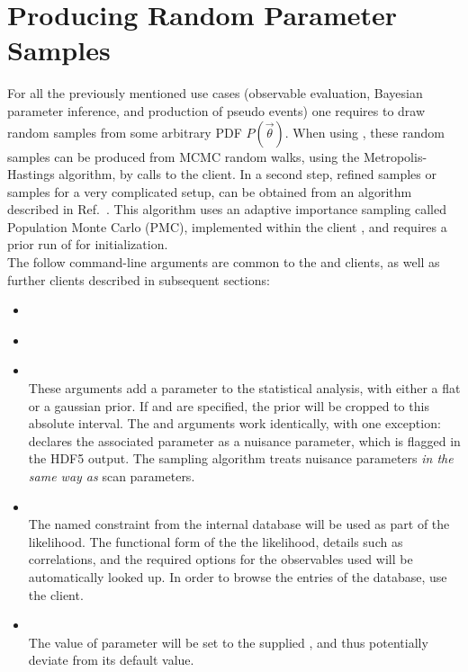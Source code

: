 \section{Producing Random Parameter Samples}
\label{sec:usage:eos-sample-mcmc+pmc}

For all the previously mentioned use cases (observable evaluation, Bayesian
parameter inference, and production of pseudo events) one requires to draw
random samples from some arbitrary \gls{PDF} $P(\vec\theta)$.  When using \EOS,
these random samples can be produced from \gls{MCMC} random walks, using the
Metropolis-Hastings algorithm, by calls to the  client.
In a second step, refined samples or samples for a very complicated setup, can
be obtained from an algorithm described in Ref.~\cite{Beaujean:2013}. This
algorithm uses an adaptive importance sampling called Population Monte Carlo
(PMC), implemented within the client , and requires a
prior run of  for initialization.\\


The follow command-line arguments are common to the  and 
 clients, as well as further clients described in subsequent
sections:
\begin{itemize}
    \item[] \\[-3\medskipamount]
    \item[] \\[-3\medskipamount]
    \item[] \\[\medskipamount]
        These arguments add a parameter to the statistical analysis, with
        either a flat or a gaussian prior. If  and
         are specified, the prior will be cropped to this
        absolute interval.  The  and 
        arguments work identically, with one exception: 
        declares the associated parameter as a nuisance parameter, which is
        flagged in the \gls{HDF5} output. The sampling algorithm treats nuisance
        parameters \emph{in the same way as} scan parameters.

    \item[] \\[\medskipamount]
        The named constraint from the internal database will be used as part of
        the likelihood. The functional form of the the likelihood, details such
        as correlations, and the required options for the observables used will
        be automatically looked up. In order to browse the entries of the
        database, use the  client.

    \item[] \\[\medskipamount]
        The value of parameter  will be set to the supplied
        , and thus potentially deviate from its default value.
\end{itemize}

